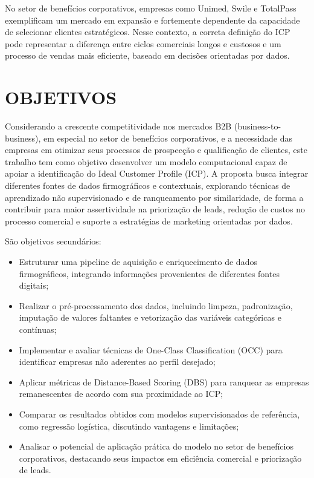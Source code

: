 No setor de benefícios corporativos, empresas como Unimed, Swile e TotalPass exemplificam um mercado em expansão e fortemente dependente da capacidade de selecionar clientes estratégicos. Nesse contexto, a correta definição do ICP pode representar a diferença entre ciclos comerciais longos e custosos e um processo de vendas mais eficiente, baseado em decisões orientadas por dados.

\section{OBJETIVOS}

Considerando a crescente competitividade nos mercados B2B (business-to-business), em especial no setor de benefícios corporativos, e a necessidade das empresas em otimizar seus processos de prospecção e qualificação de clientes, este trabalho tem como objetivo desenvolver um modelo computacional capaz de apoiar a identificação do Ideal Customer Profile (ICP). A proposta busca integrar diferentes fontes de dados firmográficos e contextuais, explorando técnicas de aprendizado não supervisionado e de ranqueamento por similaridade, de forma a contribuir para maior assertividade na priorização de leads, redução de custos no processo comercial e suporte a estratégias de marketing orientadas por dados. 

São objetivos secundários: 

\begin{itemize}
    \item Estruturar uma pipeline de aquisição e enriquecimento de dados firmográficos, integrando informações provenientes de diferentes fontes digitais;
    \item Realizar o pré-processamento dos dados, incluindo limpeza, padronização, imputação de valores faltantes e vetorização das variáveis categóricas e contínuas;
    \item Implementar e avaliar técnicas de One-Class Classification (OCC) para identificar empresas não aderentes ao perfil desejado;
    \item Aplicar métricas de Distance-Based Scoring (DBS) para ranquear as empresas remanescentes de acordo com sua proximidade ao ICP;
    \item Comparar os resultados obtidos com modelos supervisionados de referência, como regressão logística, discutindo vantagens e limitações;
    \item Analisar o potencial de aplicação prática do modelo no setor de benefícios corporativos, destacando seus impactos em eficiência comercial e priorização de leads.
\end{itemize}

